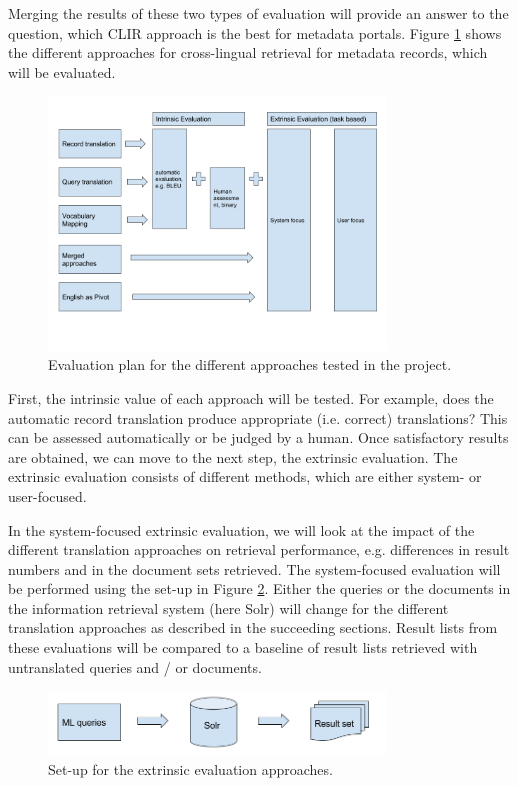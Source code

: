 \documentclass[a4paper,11pt]{article}
\begin{document}
Merging the results of these two types of evaluation will provide an answer to the question, which CLIR approach is the best for metadata portals. Figure \ref{fig1} shows the different approaches for cross-lingual retrieval for metadata records, which will be evaluated. 
\begin{figure}[h]
	\centering
  \includegraphics[width=0.8\textwidth]{./img/overview_evaluation.png}
	\caption{Evaluation plan for the different approaches tested in the project.}
	\label{fig1}
\end{figure}

First, the intrinsic value of each approach will be tested. For example, does the automatic record translation produce appropriate (i.e. correct) translations? This can be assessed automatically or be judged by a human. Once satisfactory results are obtained, we can move to the next step, the extrinsic evaluation. The extrinsic evaluation consists of different methods, which are either system- or user-focused.

In the system-focused extrinsic evaluation, we will look at the impact of the different translation approaches on retrieval performance, e.g. differences in result numbers and in the document sets retrieved. The system-focused evaluation will be performed using the set-up in Figure \ref{fig2}. Either the queries or the documents in the information retrieval system (here Solr) will change for the different translation approaches as described in the succeeding sections. Result lists from these evaluations will be compared to a baseline of result lists retrieved with untranslated queries and / or documents.

\begin{figure}[h]
	\centering
  \includegraphics[width=0.8\textwidth]{./img/Info_sys.png}
	\caption{Set-up for the extrinsic evaluation approaches.}
	\label{fig2}
\end{figure}
\end{document}
